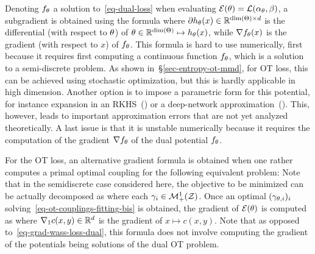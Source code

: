 Denoting $f_\theta$ a solution to~\eqref{eq-dual-loss} when evaluating $\mathcal{E}(\theta) = \mathcal{L}(\alpha_\theta,\beta)$, a subgradient is obtained using the formula
where $\partial h_\theta(x) \in \mathbb{R}^{\text{dim}(\Theta) \times d}$ is the differential (with respect to $\theta$) of $\theta \in \mathbb{R}^{\text{dim}(\Theta)} \mapsto h_\theta(x)$, while $\nabla f_\theta(x)$ is the gradient (with respect to $x$) of $f_\theta$. 
%
This formula is hard to use numerically, first because it requires first computing a continuous function $f_\theta$, which is a solution to a semi-discrete problem. As shown in~\S\ref{sec-entropy-ot-mmd}, for OT loss, this can be achieved using stochastic optimization, but this is hardly applicable in high dimension. Another option is to impose a parametric form for this potential, for instance expansion in an RKHS~(\citet{genevay2016stochastic}) or a deep-network approximation~(\citep{WassersteinGAN}). This, however, leads to important approximation errors that are not yet analyzed theoretically.
%
A last issue is that it is unstable numerically because it requires the computation of the gradient $\nabla f_\theta$ of the dual potential $f_\theta$.

For the OT loss, an alternative gradient formula is obtained when one rather computes a primal optimal coupling  for the following equivalent problem:
Note that in the semidiscrete case considered here, the objective to be minimized can be actually decomposed as 
where each $\gamma_i \in \mathcal{M}_+^1(\mathcal{Z})$. 
%
Once an optimal $(\gamma_{\theta,i})_i$ solving~\eqref{eq-ot-couplings-fitting-bis} is obtained, the gradient of $\mathcal{E}(\theta)$ is computed as
where $\nabla_1 c(x,y) \in \mathbb{R}^d$ is the gradient of $x \mapsto c(x,y)$. Note that as opposed to~\eqref{eq-grad-wass-loss-dual}, this formula does not involve computing the gradient of the potentials being solutions of the dual OT problem.

